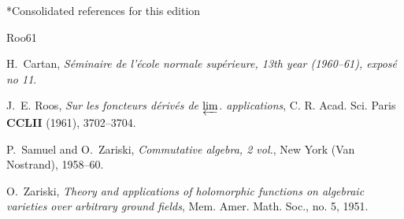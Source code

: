 \documentclass[oneside]{amsart}
\makeatletter
\theoremstyle{ega-env-style}
\theoremstyle{ega-thm-env-style}
\theoremstyle{ega-defn-env-style}
\def\section{\@startsection{section}{1}%
  \z@{.7\linespacing\@plus\linespacing}{.5\linespacing}%
  {\normalfont\bfseries\Large\scshape\centering}}
\makeatother
\begin{document}
\section*{Consolidated references for this edition}
%
\providecommand{\bysame}{\leavevmode\hbox to3em{\hrulefill}\thinspace}
\providecommand{\MR}{\relax\ifhmode\unskip\space\fi MR }
%
\providecommand{\MRhref}[2]{%
  \href{http://www.ams.org/mathscinet-getitem?mr=#1}{#2}
}
\providecommand{\href}[2]{#2}
\begin{thebibliography}{Roo61}

H.~Cartan, \emph{S\'eminaire de l'\'ecole normale sup\'erieure, 13th year
  (1960--61), expos\'e no 11}.

J.~E. Roos, \emph{Sur les foncteurs d\'eriv\'es de $\varprojlim$.
  applications}, C. R. Acad. Sci. Paris \textbf{CCLII} (1961), 3702--3704.

P.~Samuel and O.~Zariski, \emph{Commutative algebra, 2 vol.}, New York (Van
  Nostrand), 1958--60.

O.~Zariski, \emph{Theory and applications of holomorphic functions on algebraic
  varieties over arbitrary ground fields}, Mem. Amer. Math. Soc., no. 5, 1951.

\end{thebibliography}


\end{document}
